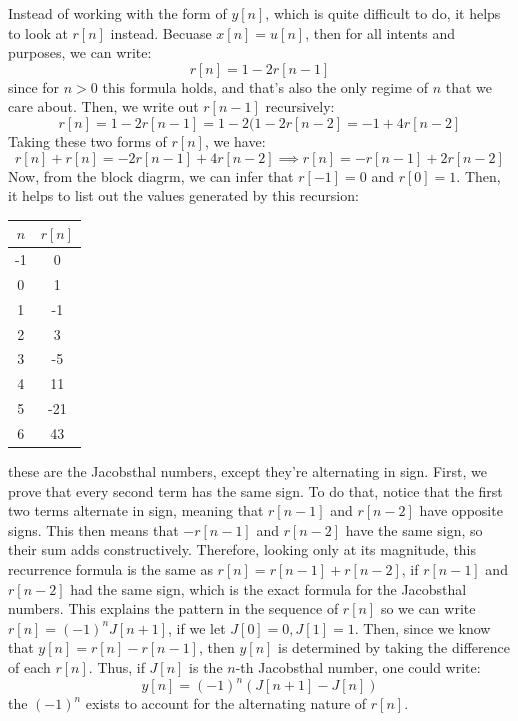 \documentclass[10pt]{article}
\begin{document}
\begin{enumerate}[label=\alph*)]
			\begin{solution}
				Instead of working with the form of \( y[n] \), which is quite difficult to do, it helps to 
				look at \( r[n] \) instead. Becuase \( x[n] = u[n] \), then for all intents and purposes, 
				we can write: 
				 \[
					 r[n] = 1 - 2r[n - 1]
				\] 
				since for \( n > 0 \) this formula holds, and that's also the only regime of  \( n \) that we 
				care about. Then, we write out \( r[n -1] \) recursively: 
				\[
					r[n] = 1 - 2r[n - 1] = 1 - 2(1 - 2r[n - 2] = -1 + 4r[n -2]
				\] 
				Taking these two forms of \( r[n] \), we have: 
				\[
					r[n] + r[n] = -2r[n - 1] + 4r[n - 2] \implies r[n] = -r[n - 1] + 2r[n - 2]
				\] 
				Now, from the block diagrm, we can infer that \( r[-1] = 0 \) and \( r[0] = 1 \). Then, it 
				helps to list out the values generated by this recursion:
				\begin{center}
					\begin{tabular}{c|c}
						\( n \) & \( r[n] \) \\
						\hline
						-1 & 0\\
						0 & 1\\
						1 & -1\\
						2 & 3\\
						3 & -5\\
						4 & 11\\
						5& -21\\
						6 & 43
					\end{tabular}
				\end{center}
				these are the Jacobsthal numbers, except they're alternating in sign. First, we prove that every second 
				term has the same sign. To do that, notice that the first two terms alternate in sign, meaning that 
				\( r[n - 1] \) and \( r[n -2] \) have opposite signs. This then means that \( -r[n-1] \) and 
				\( r[n-2] \) have the same sign, so their sum adds constructively. Therefore, looking only at its 
				magnitude,
				this recurrence formula is the same as \( r[n] = r[n -1] + r[n-2] \), if \( r[n-1] \) and 
				\( r[n-2] \) had the same sign, which is the exact formula for the Jacobsthal numbers. This explains 
				the pattern in the sequence of \( r[n] \) so we can write \( r[n] = (-1)^{n}J[n+1] \), if we 
				let \( J[0] = 0, J[1] = 1 \). 
				Then, since we know that \( y[n] = r[n] - r[n-1] \), then 
				\( y[n] \) is determined by taking the difference of each \( r[n] \). Thus, if \( J[n] \) is the 
				\( n \)-th Jacobsthal number, one could write: 
				\[
					y[n] = (-1)^{n}(J[n+1] - J[n])
				\]
				the \( (-1)^{n} \) exists to account for the alternating nature of \( r[n] \). 
			\end{solution}
	\end{enumerate}
\end{document}
